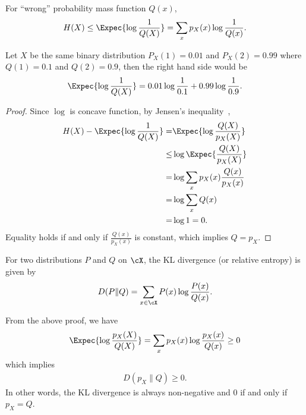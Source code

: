 \documentclass{article}
\begin{document}
\begin{theorem}[Mismatch]\label{thm:mismatch}
For ``wrong'' probability mass function $Q(x)$,
\begin{align}
    H(X) \leq \Expec{\log \frac{1}{Q(X)}} = \sum_{x} p_X(x) \log \frac{1}{Q(x)}.\label{eq:wrong pmf}
\end{align}
\end{theorem}
\begin{example}
    Let $X$ be the same binary distribution $P_X(1) = 0.01$ and $P_X(2) = 0.99$ where $Q(1) = 0.1$ and $Q(2) = 0.9$, then the right hand side would be
    \begin{align}
        \Expec{\log \frac{1}{Q(X)}} = 0.01 \log \frac{1}{0.1} + 0.99 \log\frac{1}{0.9}.
    \end{align}
\end{example}
\begin{proof}
    Since $\log$ is concave function, by Jensen's inequality~\cite{jensen1906fonctions},
    \begin{align}
        H(X) - \Expec{\log \frac{1}{Q(X)}} =& \Expec{\log \frac{Q(X)}{p_X(X)}}\\
        \leq& \log \Expec{\frac{Q(X)}{p_X(X)}}\\
        =& \log \sum_x p_X(x)\frac{Q(x)}{p_X(x)}\\
        =& \log \sum_x Q(x)\\
        =& \log 1 =0.
    \end{align}
    Equality holds if and only if $\frac{Q(x)}{p_X(x)}$ is constant, which implies $Q = p_X$.
\end{proof}

\begin{definition}
For two distributions $P$ and $Q$ on $\cX$, the KL divergence (or relative entropy) is given by
\begin{align}
    D(P \|Q) =  \sum_{x\in\cX} P(x) \log \frac{P(x)}{Q(x)}.
\end{align}
\end{definition}
\begin{remark}
    From the above proof, we have
    \begin{align}
        \Expec{\log \frac{p_X(X)}{Q(X)}} = \sum_{x} p_X(x) \log\frac{p_X(x)}{Q(x)}\geq 0
    \end{align}
    which implies
    \begin{align}
        D(p_X\|Q) \geq 0.
    \end{align}
    In other words, the KL divergence is always non-negative and 0 if and only if $p_X=Q$.
\end{remark}
\end{document}
